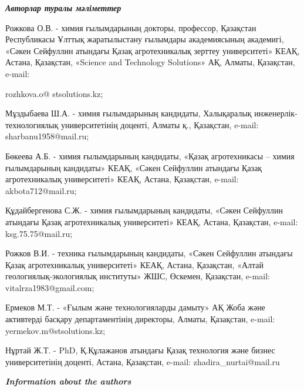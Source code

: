 \emph{{\bfseries Авторлар туралы мәліметтер}}

\begin{noparindent}
Рожкова О.В. - химия ғылымдарының докторы, профессор, Қазақстан
Республикасы Ұлттық жаратылыстану ғылымдары академиясының академигі,
«Сәкен Сейфуллин атындағы Қазақ агротехникалық зерттеу университеті»
КЕАҚ, Астана, Қазақстан, «Science and Technology Solutions» АҚ, Алматы,
Қазақстан, e-mail:

rozhkova.o@ stsolutions.kz;

Мұздыбаева Ш.А. - химия ғылымдарының кандидаты, Халықаралық
инженерлік-технологиялық университетінің доценті, Алматы қ., Қазақстан,
e-mail: sharbanu1958@mail.ru;

Бөкеева А.Б. - химия ғылымдарының кандидаты, «Қазақ агротехникасы --
химия ғылымдарының кандидаты» КЕАҚ, «Сәкен Сейфуллин атындағы Қазақ
агротехникалық университеті» КЕАҚ, Астана, Қазақстан, e-mail:
akbota712@mail.ru;

Құдайбергенова С.Ж. - химия ғылымдарының кандидаты, «Сәкен Сейфуллин
атындағы Қазақ агротехникалық университеті» КЕАҚ, Астана, Қазақстан,
e-mail: ksg.75.75@mail.ru;

Рожков В.И. - техника ғылымдарының кандидаты, «Сәкен Сейфуллин атындағы
Қазақ агротехникалық университеті» КЕАҚ, Астана, Қазақстан, «Алтай
геологиялық-экологиялық институты» ЖШС, Өскемен, Қазақстан, e-mail:
vitalrza1983@gmail.com;

Ермеков М.Т. - «Ғылым және технологияларды дамыту» АҚ Жоба және
активтерді басқару департаментінің директоры, Алматы, Қазақстан, e-mail:
yermekov.m@stsolutions.kz;

Нұртай Ж.Т. - PhD, Қ.Құлажанов атындағы Қазақ технология және бизнес
университетінің доценті, Астана, Қазақстан, e-mail:
zhadira\_nurtai@mail.ru
\end{noparindent}

\emph{{\bfseries Information about the authors}}

